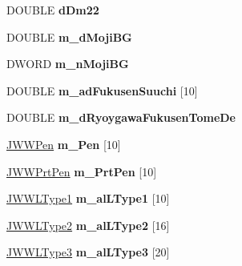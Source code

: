 \begin{DoxyCompactItemize}
\item 
\hypertarget{classJWWHead_a5838977f62db9b352985d87988b20a05}{D\-O\-U\-B\-L\-E {\bfseries d\-Dm22}}\label{classJWWHead_a5838977f62db9b352985d87988b20a05}

\item 
\hypertarget{classJWWHead_ada38dc3d507bfb1384febfe01853da85}{D\-O\-U\-B\-L\-E {\bfseries m\-\_\-d\-Moji\-B\-G}}\label{classJWWHead_ada38dc3d507bfb1384febfe01853da85}

\item 
\hypertarget{classJWWHead_a427fffad3e7932c315c8ab11a9e54132}{D\-W\-O\-R\-D {\bfseries m\-\_\-n\-Moji\-B\-G}}\label{classJWWHead_a427fffad3e7932c315c8ab11a9e54132}

\item 
\hypertarget{classJWWHead_adf8abefdf5485a968c5f5d8649f6ba3d}{D\-O\-U\-B\-L\-E {\bfseries m\-\_\-ad\-Fukusen\-Suuchi} \mbox{[}10\mbox{]}}\label{classJWWHead_adf8abefdf5485a968c5f5d8649f6ba3d}

\item 
\hypertarget{classJWWHead_a8ce3fbaefcc51140ea6362f47a6a6134}{D\-O\-U\-B\-L\-E {\bfseries m\-\_\-d\-Ryoygawa\-Fukusen\-Tome\-De}}\label{classJWWHead_a8ce3fbaefcc51140ea6362f47a6a6134}

\item 
\hypertarget{classJWWHead_ab108d5d7dbc4b839965f596fddfe64bd}{\hyperlink{struct__JWWPen}{J\-W\-W\-Pen} {\bfseries m\-\_\-\-Pen} \mbox{[}10\mbox{]}}\label{classJWWHead_ab108d5d7dbc4b839965f596fddfe64bd}

\item 
\hypertarget{classJWWHead_a280879584477a98bc06f8846650095d3}{\hyperlink{structJWWPrtPen}{J\-W\-W\-Prt\-Pen} {\bfseries m\-\_\-\-Prt\-Pen} \mbox{[}10\mbox{]}}\label{classJWWHead_a280879584477a98bc06f8846650095d3}

\item 
\hypertarget{classJWWHead_aa7116de20de8b8a1a612131e737f3d6e}{\hyperlink{structJWWLType1}{J\-W\-W\-L\-Type1} {\bfseries m\-\_\-al\-L\-Type1} \mbox{[}10\mbox{]}}\label{classJWWHead_aa7116de20de8b8a1a612131e737f3d6e}

\item 
\hypertarget{classJWWHead_ada81105beaca16cb661f8778d707b6c1}{\hyperlink{struct__JWWLType2}{J\-W\-W\-L\-Type2} {\bfseries m\-\_\-al\-L\-Type2} \mbox{[}16\mbox{]}}\label{classJWWHead_ada81105beaca16cb661f8778d707b6c1}

\item 
\hypertarget{classJWWHead_a68a735cf6a9514935165287c99e3b5bb}{\hyperlink{struct__JWWLType3}{J\-W\-W\-L\-Type3} {\bfseries m\-\_\-al\-L\-Type3} \mbox{[}20\mbox{]}}\label{classJWWHead_a68a735cf6a9514935165287c99e3b5bb}


\end{DoxyCompactItemize}
